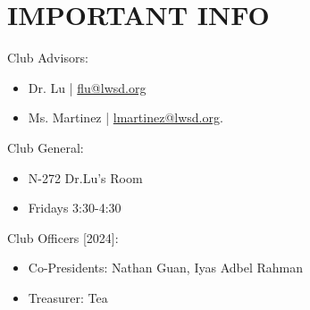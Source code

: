 \chapter*{IMPORTANT INFO}

Club Advisors:

\begin{itemize}
    \item Dr. Lu | \href{flu@lwsd.org}{flu@lwsd.org}
    \item Ms. Martinez | \href{lmartinez@lwsd.org}{lmartinez@lwsd.org}.  
\end{itemize}

\noindent
Club General:
\begin{itemize}
    \item N-272 Dr.Lu's Room
    \item Fridays 3:30-4:30
\end{itemize}

\noindent
Club Officers [2024]:
\begin{itemize}
    \item Co-Presidents: Nathan Guan, Iyas Adbel Rahman
    \item Treasurer: Tea
\end{itemize}
